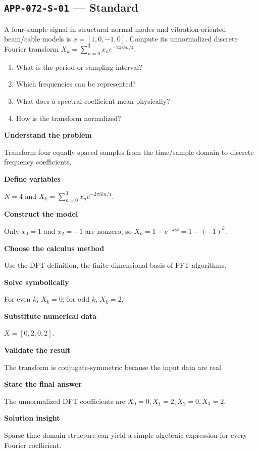 \documentclass[11pt]{book}
\newcommand{\pid}[1]{\texttt{#1}}
\begin{document}
\subsection*{\pid{APP-072-S-01} — Standard}
\begin{problembox}
A four-sample signal in structural normal modes and vibration-oriented beam/cable models is $x=[1,0,-1,0]$. Compute its unnormalized discrete Fourier transform $X_k=\sum_{n=0}^3 x_ne^{-2\pi i kn/4}$.
\end{problembox}
\begin{promptbox}\begin{enumerate}
\item What is the period or sampling interval?
\item Which frequencies can be represented?
\item What does a spectral coefficient mean physically?
\item How is the transform normalized?
\end{enumerate}\end{promptbox}
\begin{solutionbox}
\textbf{Understand the problem}\par Transform four equally spaced samples from the time/sample domain to discrete frequency coefficients.\par\medskip
\textbf{Define variables}\par $N=4$ and $X_k=\sum_{n=0}^{3}x_n e^{-2\pi i kn/4}$.\par\medskip
\textbf{Construct the model}\par Only $x_0=1$ and $x_2=-1$ are nonzero, so $X_k=1-e^{-\pi i k}=1-(-1)^k$.\par\medskip
\textbf{Choose the calculus method}\par Use the DFT definition, the finite-dimensional basis of FFT algorithms.\par\medskip
\textbf{Solve symbolically}\par For even $k$, $X_k=0$; for odd $k$, $X_k=2$.\par\medskip
\textbf{Substitute numerical data}\par $X=[0,2,0,2]$.\par\medskip
\textbf{Validate the result}\par The transform is conjugate-symmetric because the input data are real.\par\medskip
\textbf{State the final answer}\par The unnormalized DFT coefficients are $X_0=0,X_1=2,X_2=0,X_3=2$.\par\medskip
\textbf{Solution insight}\par Sparse time-domain structure can yield a simple algebraic expression for every Fourier coefficient.\par\medskip
\end{solutionbox}
\end{document}
